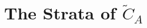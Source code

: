 \documentclass[11pt]{article}
\theoremstyle{definition}
\theoremstyle{remark}
\def\wt#1{\widetilde{#1}}
\def\R{\mathbb{R}}
\def\rI{{\mathring{I}}}
\def\tn#1{\textnormal{#1}}
\def\pr{{\textnormal{pr}}}
\begin{document}
%
%










\section{The Strata of  \texorpdfstring{$\wt{C}_A$}{the big configuration space}}
\end{document}

